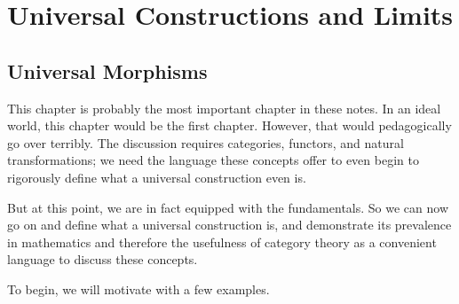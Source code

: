 \chapter{Universal Constructions and Limits} 
    \section{Universal Morphisms}\label{section:universal_morphisms}

    This chapter is probably the most important chapter in these notes. 
    In an ideal world, this chapter would be the first chapter. 
    However, that would pedagogically go over terribly. The discussion requires 
    categories, functors, and natural transformations; we need the language 
    these concepts offer 
    to even begin to rigorously define what a universal construction even is. 

    But at this point, we are in fact equipped with the fundamentals. So we can now 
    go on and define what a universal construction is, and demonstrate its prevalence 
    in mathematics and therefore the usefulness of category theory as a convenient language 
    to discuss these concepts. 

    To begin, we will motivate with a few examples.

